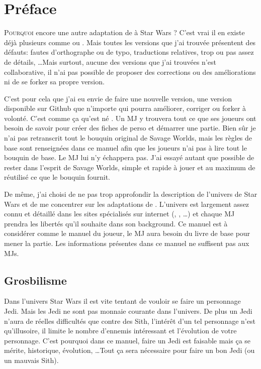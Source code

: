 \onecolumn
\section{Préface}

\lettrine{P}{ourquoi} encore une autre adaptation de  à {\jedifont Star Wars} ? C’est vrai il en existe déjà plusieurs comme  ou . Mais toutes les versions que j’ai trouvée présentent des défauts: fautes d’orthographe ou de typo, traductions relatives, trop ou pas assez de détails, \ldots Mais surtout, aucune des versions que j’ai trouvées n’est collaborative, il n’ai pas possible de proposer des corrections ou des améliorations ni de se forker sa propre version.

C’est pour cela que j’ai eu envie de faire une nouvelle version, une version disponible sur Github que n’importe qui pourra améliorer, corriger ou forker à volonté. C’est comme ça qu’est né {\jedifont \doctitle}. Un MJ y trouvera tout ce que ses joueurs ont besoin de savoir pour créer des fiches de perso et démarrer une partie. Bien sûr je n’ai pas retranscrit tout le bouquin original de Savage Worlds, mais les règles de base sont renseignées dans ce manuel afin que les joueurs n’ai pas à lire tout le bouquin de base. Le MJ lui n’y échappera pas. J’ai essayé autant que possible de rester dans l’esprit de Savage Worlds, simple et rapide à jouer et au maximum de réutilisé ce que le bouquin fournit.

De même, j’ai choisi de ne pas trop approfondir la description de l’univers de Star Wars et de me concentrer sur les adaptations de . L’univers est largement assez connu et détaillé dans les sites spécialisés sur internet (, , \ldots) et chaque MJ prendra les libertés qu’il souhaite dans son background. Ce manuel est à considérer comme le manuel du joueur, le MJ aura besoin du livre de base  pour mener la partie. Les informations présentes dans ce manuel ne suffisent pas aux MJs.

\subsection{Grosbilisme}
Dans l’univers Star Wars il est vite tentant de vouloir se faire un personnage Jedi. Mais les Jedi ne sont pas monnaie courante dans l’univers. De plus un Jedi n’aura de réelles difficultés que contre des Sith, l’intérêt d’un tel personnage n’est qu’illusoire, il limite le nombre d’ennemis intéressant et l’évolution de votre personnage. C’est pourquoi dans ce manuel, faire un Jedi est faisable mais ça se mérite, historique, évolution, \ldots Tout ça sera nécessaire pour faire un bon Jedi (ou un mauvais Sith).

